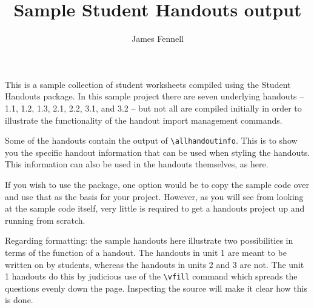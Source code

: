 \documentclass[10pt,oneside,letterpaper]{article}
\title{Sample Student Handouts output}
\author{James Fennell}
\begin{document}
\maketitle


\noindent
This is a sample collection of student worksheets compiled using the Student Handouts package.
	In this sample project there are seven underlying handouts -- 1.1, 1.2, 1.3, 2.1, 2.2, 3.1, and 3.2 -- 
	but not all are compiled initially in order to illustrate the functionality of the handout import management commands.

Some of the handouts contain the output of \verb$\allhandoutinfo$.
	This is to show you the specific handout information that can be used when styling the handouts.
This information can also be used in the handouts themselves, as here.

If you wish to use the package, one option would be to copy the sample code over and use that as the basis for your project.
	However, as you will see from looking at the sample code itself, very little is required to get a handouts project up and running from scratch.

\vspace{\baselineskip}
\noindent
Regarding formatting: the sample handouts here illustrate two possibilities in terms of the function of a handout.
	The handouts in unit 1 are meant to be written on by students, whereas the handouts in units 2 and 3 are not. 
	The unit 1 handouts do this by judicious use of the \verb$\vfill$ command which spreads the questions evenly down the page.
	Inspecting the source will make it clear how this is done.




\tableofcontents



\renewcommand{\thehandoutsdirectory}{worksheets/}
\renewcommand{\thehandoutscredit}{NYU Calculus 1 Summer 2015}







\end{document}
